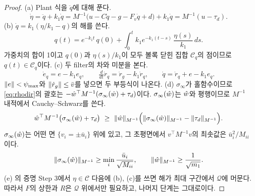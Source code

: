 \documentclass[11pt]{article}\usepackage[margin=1in]{geometry}\usepackage{amsmath,amssymb,amsthm,mathtools}\usepackage{graphicx}\graphicspath{{figures/}{../figures/}{figs/}{./}}\usepackage{enumitem}\usepackage{hyperref}\usepackage{cleveref}\usepackage{tikz}\usetikzlibrary{arrows.meta,positioning,calc,shapes.geometric}\usepackage{float}\usepackage[most]{tcolorbox}\usepackage{kotex}\usepackage{booktabs}\emergencystretch=1.6em\tolerance=2000 \crefname{assumption}{Assumption}{Assumptions}\Crefname{assumption}{Assumption}{Assumptions}\crefname{definition}{Definition}{Definitions}\Crefname{definition}{Definition}{Definitions}\crefname{proposition}{Proposition}{Propositions}\Crefname{proposition}{Proposition}{Propositions}\crefname{fact}{Fact}{Facts}\Crefname{fact}{Fact}{Facts} \newtheorem{assumption}{Assumption}\newtheorem{definition}{Definition}\newtheorem{lemma}{Lemma}\newtheorem{proposition}{Proposition}\newtheorem{theorem}{Theorem}\newtheorem{corollary}{Corollary}\newtheorem{fact}{Fact}\theoremstyle{remark}\newtheorem{remark}{Remark} \newcommand{\R}{\mathbb{R}}\newcommand{\U}{\mathcal U}
\newcommand{\Cset}{\mathcal C}\newcommand{\Pcl}{\mathcal P}\newcommand{\Zset}{\mathcal Z_0}\newcommand{\Xset}{\mathcal X_0}
\begin{document}
\begin{proof}
(a) Plant 식을 $\ddot q$에 대해 푼다.
\[
\dot\eta=\ddot q+k_1\dot q=M^{-1}\big(u-C\dot q-g-F_v\dot q+d\big)+k_1\dot q=M^{-1}(u-\tau_d).
\]
(b) $\dot q=k_1(\eta/k_1-q)$의 해를 쓴다.
\[
q(t)=e^{-k_1t}\,q(0)+\int_0^t k_1e^{-k_1(t-s)}\,\frac{\eta(s)}{k_1}\,ds .
\]
가중치의 합이 1이고 $q(0)$과 $\eta(s)/k_1$이 모두 볼록 닫힌 집합 $\Cset_q$의 점이므로 $q(t)\in\Cset_q$이다. (c) 두 filter의 차와 미분을 본다.
\[
\dot e_q=e-k_1e_q,\qquad \tfrac{d}{dt}\dot r_q=\dot r_g-k_1\dot r_q,\qquad \dot q=\dot r_q+e-k_1e_q .
\]
$\lVert e\rVert<\psi_{\max}$와 $\lVert \dot r_g\rVert\le\bar v$를 넣으면 두 부등식이 나온다. (d) $\sigma_\infty$가 홀함수이므로 \eqref{eq:rhodir}의 괄호는 $-\hat w^\top M^{-1}(\sigma_\infty(\hat w)+\tau_d)$이다. $\sigma_\infty(\hat w)$는 $\hat w$와 평행이므로 $M^{-1}$ 내적에서 Cauchy--Schwarz를 쓴다.
\[
\what^\top M^{-1}\big(\sigma_\infty(\what)+\tau_d\big)\ \ge\ \norm{\what}_{M^{-1}}\Big(\norm{\sigma_\infty(\what)}_{M^{-1}}-\norm{\tau_d}_{M^{-1}}\Big).
\]
$\sigma_\infty(\hat w)$는 어떤 면 $\{v_i=\pm\bar u_i\}$ 위에 있고, 그 초평면에서 $v^\top M^{-1}v$의 최솟값은 $\bar u_i^2/M_{ii}$이다.
\[
\lVert \sigma_\infty(\hat w)\rVert_{M^{-1}}\ge\min_i\frac{\bar u_i}{\sqrt{M_{ii}}},\qquad \lVert \hat w\rVert_{M^{-1}}\ge\frac{1}{\sqrt{m_1}} .
\]
(e) 의 증명 Step 3에서 $\eta\in\Cset$ 다음에 (b), (c)를 쓰면 해가 최대 구간에서 $\mathcal Q$에 머문다. 따라서 $F$의 상한과 $R$은 $\mathcal Q$ 위에서만 필요하고, 나머지 단계는 그대로이다.
\end{proof}
\end{document}
